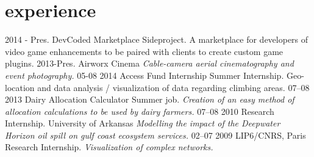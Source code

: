 \documentclass[]{thoma-cv}
\begin{document}
\section{experience}

\begin{entrylist}
  \entry
    {2014 - Pres.}
    {DevCoded Marketplace}
    {Sideproject.}
    {A marketplace for developers of video game enhancements to be paired       with clients to create custom game plugins.}
  \entry
    {2013-Pres.}
    {Airworx Cinema}
    {}
    {\emph{Cable-camera aerial cinematography and event photography.}}
  \entry
    {05-08 2014}
    {Access Fund Internship}
    {Summer Internship.}
    {Geo-location and data analysis / visualization of data regarding
    climbing areas.}
  \entry
    {07–08 2013}
    {Dairy Allocation Calculator}
    {Summer job.}
    {\emph{Creation of an easy method of allocation calculations to be used by dairy farmers.}}
  \entry
    {07–08 2010}
    {Research Internship.}
    {University of Arkansas}
    {\emph{Modelling the impact of the Deepwater Horizon oil spill on gulf coast ecosystem services.}}
  \entry
    {02–07 2009}
    {LIP6/CNRS, Paris}
    {Research Internship.}
    {\emph{Visualization of complex networks.}}
\end{entrylist}

\end{document}

